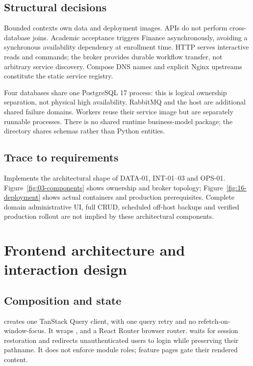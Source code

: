 \documentclass[10pt,a4paper]{article}
\begin{document}
\subsection{Structural decisions}
Bounded contexts own data and deployment images. APIs do not perform cross-database
joins. Academic acceptance triggers Finance asynchronously, avoiding a synchronous
availability dependency at enrollment time. HTTP serves interactive reads and commands;
the broker provides durable workflow transfer, not arbitrary service discovery.
Compose DNS names and explicit Nginx upstreams constitute the static service registry.

Four databases share one PostgreSQL 17 process: this is logical ownership separation,
not physical high availability. RabbitMQ and the host are additional shared failure
domains. Workers reuse their service image but are separately runnable processes.
There is no shared runtime business-model package; the  directory
shares schemas rather than Python entities.

\subsection{Trace to requirements}
Implements the architectural shape of DATA-01, INT-01--03 and OPS-01.
Figure~\ref{fig:03-components} shows ownership and broker topology;
Figure~\ref{fig:16-deployment} shows actual containers and production prerequisites.
Complete domain administrative UI, full CRUD, scheduled off-host backups and verified
production rollout are not implied by these architectural components.

\clearpage
\section{Frontend architecture and interaction design}
\subsection{Composition and state}
 creates one TanStack Query client, with one query retry and no
refetch-on-window-focus. It wraps ,  and a React Router
browser router.  waits for session restoration and redirects
unauthenticated users to login while preserving their pathname. It does not enforce
module roles; feature pages gate their rendered content.
\end{document}
